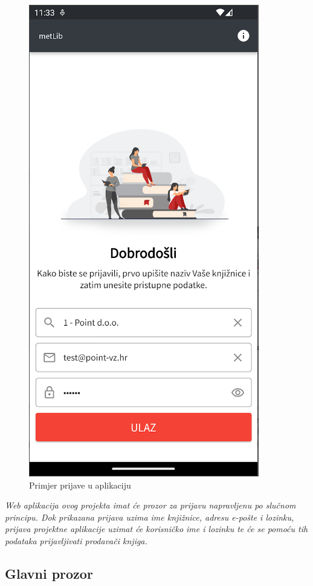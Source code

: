 	\begin{figure}[H]
		\includegraphics[scale=0.4]{slike/Login.PNG} %
		\centering
		\caption{Primjer prijave u aplikaciju}
		\label{fig:prijava}
	\end{figure}
	
	\textit{Web aplikacija ovog projekta imat će prozor za prijavu napravljenu po slučnom principu. Dok prikazana prijava uzima ime knjižnice, adresu e-pošte i lozinku, prijava projektne aplikacije uzimat će korisničko ime i lozinku te će se pomoću tih podataka prijavljivati prodavači knjiga.}
		
	\subsection{Glavni prozor}
	
